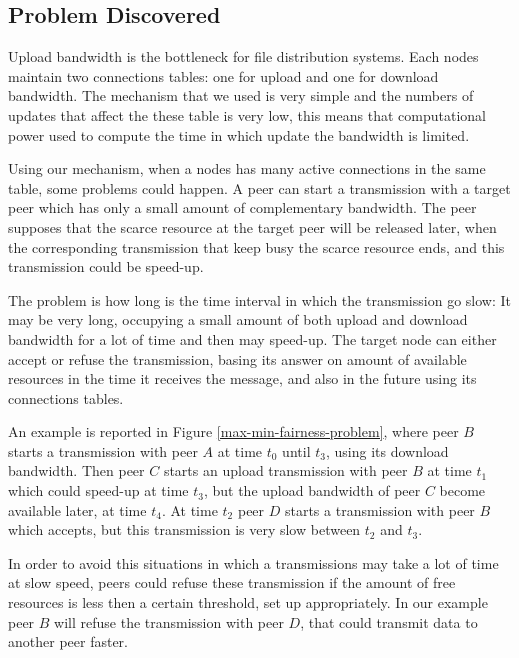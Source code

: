 \subsection{Problem Discovered}
Upload bandwidth is the bottleneck for file distribution systems. Each nodes maintain two connections tables: one for upload and one for download bandwidth. The mechanism that we used is very simple and the numbers of updates that affect the these table is very low, this means that computational power used to compute the time in which update the bandwidth is limited.

Using our mechanism, when a nodes has many active connections in the same table, some problems could happen. A peer can start a transmission with a target peer which has only a small amount of complementary bandwidth. The peer supposes that the scarce resource at the target peer will be released later, when the corresponding transmission that keep busy the scarce resource ends, and this transmission could be speed-up.

The problem is how long is the time interval in which the transmission go slow: It may be very long, occupying a small amount of both upload and download bandwidth for a lot of time and then may speed-up. The target node can either accept or refuse the transmission, basing its answer on amount of available resources in the time it receives the message, and also in the future using its connections tables.

An example is reported in Figure \ref{max-min-fairness-problem}, where peer $B$ starts a transmission with peer $A$ at time $t_{0}$ until $t_{3}$, using its download bandwidth. Then peer $C$ starts an upload transmission with peer $B$ at time $t_1$ which could speed-up at time $t_3$, but the upload bandwidth of peer $C$ become available later, at time $t_{4}$. At time $t_2$ peer $D$ starts a transmission with peer $B$ which accepts, but this transmission is very slow between $t_{2}$ and $t_{3}$.

In order to avoid this situations in which a transmissions may take a lot of time at slow speed, peers could refuse these transmission if the amount of free resources is less then a certain threshold, set up appropriately. In our example peer $B$ will refuse the transmission with peer $D$, that could transmit data to another peer faster.

